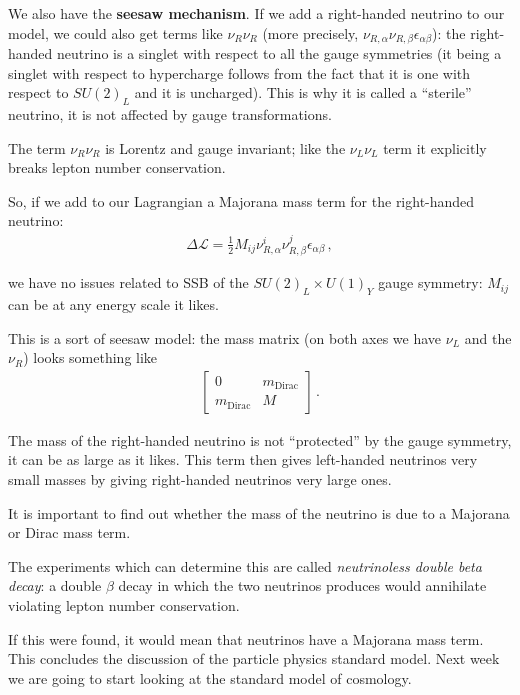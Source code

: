 \documentclass[main.tex]{subfiles}
\begin{document}
We also have the \textbf{seesaw mechanism}. 
If we add a right-handed neutrino to our model, we could also get terms like \(\nu_{R} \nu_{R}\) (more precisely, \(\nu_{R, \alpha } \nu_{R, \beta } \epsilon_{\alpha \beta }\)): the right-handed neutrino is a singlet with respect to all the gauge symmetries (it being a singlet with respect to hypercharge follows from the fact that it is one with respect to \(SU(2)_L\) and it is uncharged).
This is why it is called a ``sterile'' neutrino, it is not affected by gauge transformations. 

The term \(\nu_{R} \nu_{R}\) is Lorentz and gauge invariant; like the \(\nu_{L} \nu_{L}\) term it explicitly breaks lepton number conservation. 

So, if we add to our Lagrangian a Majorana mass term for the right-handed neutrino:  
%
\begin{align}
\Delta \mathscr{L} = \frac{1}{2} M_{ij} \nu^{i}_{R, \alpha } \nu^{j}_{R, \beta }\epsilon_{\alpha \beta }
\,,
\end{align}
%

we have no issues related to SSB of the \(SU(2)_L \times U(1)_Y\) gauge symmetry: \(M_{ij}\) can be at any energy scale it likes. 

This is a sort of seesaw model: the mass matrix (on both axes we have \(\nu_L\) and the \(\nu_{R}\)) looks something like 
%
\begin{subequations}
\begin{align}
\left[\begin{array}{cc}
0 & m _{\text{Dirac}} \\ 
m _{\text{Dirac}} & M
\end{array}\right]
\,.
\end{align}
\end{subequations}

The mass of the right-handed neutrino is not ``protected'' by the gauge symmetry, it can be as large as it likes. 
This term then gives left-handed neutrinos very small masses by giving right-handed neutrinos very large ones. 


It is important to find out whether the mass of the neutrino is due to a Majorana or Dirac mass term.

The experiments which can determine this are called \emph{neutrinoless double beta decay}: a double \(\beta \) decay in which the two neutrinos produces would annihilate violating lepton number conservation.

If this were found, it would mean that neutrinos have a Majorana mass term.
This concludes the discussion of the particle physics standard model. Next week we are going to start looking at the standard model of cosmology.
\end{document}
